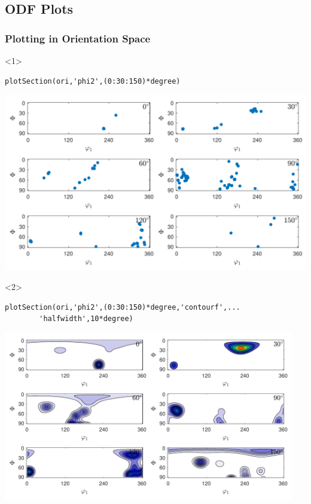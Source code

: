 \documentclass[compress]{beamer}
\begin{document}
\subsection*{ODF Plots}

\begin{frame}[fragile]
  \frametitle{Plotting in Orientation Space}

  \begin{onlyenv}<1>
    \begin{lstlisting}[style=input]
plotSection(ori,'phi2',(0:30:150)*degree)
    \end{lstlisting}

    \includegraphics[width=\textwidth]{pic/odfOri}
  \end{onlyenv}

  \begin{onlyenv}<2>
    \begin{lstlisting}[style=input]
plotSection(ori,'phi2',(0:30:150)*degree,'contourf',...
        'halfwidth',10*degree)
    \end{lstlisting}

    \includegraphics[width=0.95\textwidth]{pic/odfOriSmooth}
  \end{onlyenv}


\end{frame}
\end{document}
